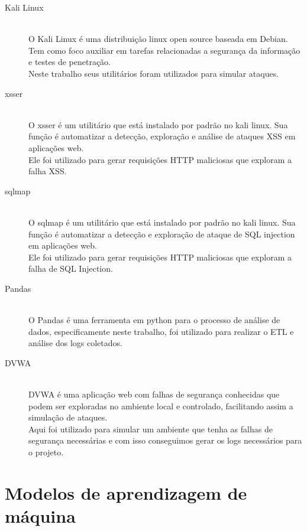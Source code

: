 \begin{description}
    \item[Kali Linux] \hfill \\ 
        O Kali Linux é uma distribuição linux open source baseada em Debian. 
        Tem como foco auxiliar em tarefas relacionadas a segurança da informação 
        e testes de penetração. \\
        Neste trabalho seus utilitários foram utilizados para simular ataques.
    \item[xsser] \hfill \\ 
        O xsser é um utilitário que está instalado por padrão no kali linux. Sua 
        função é automatizar a detecção, exploração e análise de ataques XSS em 
        aplicações web. \\
        Ele foi utilizado para gerar requisições HTTP maliciosas que exploram a falha
        XSS.
    \item[sqlmap] \hfill \\ 
        O sqlmap é um utilitário que está instalado por padrão no kali linux. Sua
        função é automatizar a detecção e exploração de ataque de SQL injection em 
        aplicações web. \\
        Ele foi utilizado para gerar requisições HTTP maliciosas que exploram a falha
        de SQL Injection.
    \item[Pandas] \hfill \\ 
        O Pandas é uma ferramenta  em python para o processo de análise de dados, 
        especificamente neste trabalho, foi utilizado para realizar o ETL e análise 
        dos logs coletados.
    \item[DVWA] \hfill \\ 
        DVWA é uma aplicação web com falhas de segurança conhecidas que podem ser 
        exploradas no ambiente local e controlado, facilitando assim a simulação de
        ataques. \\ 
        Aqui foi utilizado para simular um ambiente que tenha as falhas de segurança 
        necessárias e com isso conseguimos gerar os logs necessários para o projeto.
  \end{description}

\section{Modelos de aprendizagem de máquina}

